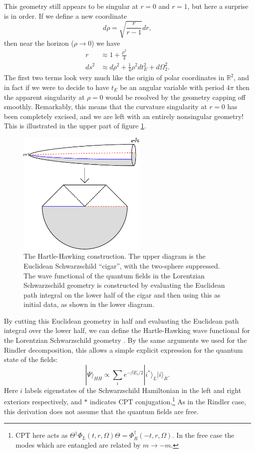 \documentclass[12pt]{article}
\newcommand{\be}{\begin{equation}}
\newcommand{\ee}{\end{equation}}
\newcommand{\ran}{\rangle}
\begin{document}
This geometry still appears to be singular at $r=0$ and $r=1$, but here a surprise is in order.  If we define a new coordinate 
\be
d\rho=\sqrt{\frac{r}{r-1}}dr,
\ee
then near the horizon ($\rho\to 0$) we have
\begin{align}\nonumber
r&\approx 1+\frac{\rho^2}{4}\\
ds^2&\approx d\rho^2+\frac{1}{4}\rho^2 dt_E^2+d\Omega_2^2. 
\end{align}
The first two terms look very much like the origin of polar coordinates in $\mathbb{R}^2$, and in fact if we were to decide to have $t_E$ be an angular variable with period $4\pi$ then the apparent singularity at $\rho=0$ would be resolved by the geometry capping off smoothly.  Remarkably, this means that the curvature singularity at $r=0$ has been completely excised, and we are left with an entirely nonsingular geometry!  This is illustrated in the upper part of figure \ref{cigar}.
\begin{figure}
\begin{center}
\includegraphics[height=6cm]{cigar.pdf}
\caption{The Hartle-Hawking construction.  The upper diagram is the Euclidean Schwarzschild ``cigar'', with the two-sphere suppressed.  The wave functional of the quantum fields in the Lorentzian Schwarzschild geometry is constructed by evaluating the Euclidean path integral on the lower half of the cigar and then using this as initial data, as shown in the lower diagram.}\label{cigar}
\end{center}
\end{figure}

By cutting this Euclidean geometry in half and evaluating the Euclidean path integral over the lower half, we can define the Hartle-Hawking wave functional for the Lorentzian Schwarzschild geometry \cite{Hartle:1976tp,Israel:1976ur}.  By the same arguments we used for the Rindler decomposition, this allows a simple explicit expression for the quantum state of the fields:
\be\label{hhs}
|\Psi\ran_{HH}\propto\sum_ie^{-\beta E_i/2}|i^*\ran_L |i\ran_R. 
\ee
Here $i$ labels eigenstates of the Schwarzschild Hamiltonian in the left and right exteriors respectively, and $*$ indicates CPT conjugation.\footnote{CPT here acts as $\Theta^\dagger \Phi_L(t,r,\Omega)\Theta=\Phi_R^\dagger(-t,r,\Omega)$.  In the free case the modes which are entangled are related by $m\to -m$.}  As in the Rindler case, this derivation does not assume that the quantum fields are free. 
\end{document}
